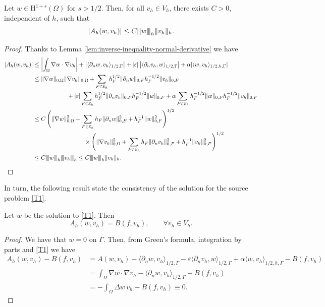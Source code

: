 \documentclass[onefignum,onetabnum,final]{siamart250211}
\numberwithin{equation}{section}
\newcommand\0{\boldsymbol{0}}
\renewcommand\O{\Omega}
\renewcommand\H{\mathrm{H}}
\newcommand\HusO{\H^{1+s}(\O)}
\def\CE{{\mathcal E}}
\newcommand{\vertiii}[1]{{\left\vert\kern-0.25ex\left\vert\kern-0.25ex\left\vert #1 
		\right\vert\kern-0.25ex\right\vert\kern-0.25ex\right\vert}}
\begin{document}
	\begin{lemma}\label{lem:continuity-in-triple-norm}
		Let $w\in\HusO$ for $s>1/2$. Then, for all $v_h\in V_h$, there exists $C>0$, independent of $h$, such that
		$$
		|A_h(w,v_h)|\leq C \vertiii{w}_h\Vert v_h\Vert_h.
		$$
	\end{lemma}
	\begin{proof}
		Thanks to Lemma \ref{lem:inverse-inequality-normal-derivative} we have
		$$
		\begin{aligned}
			|A_h(w,v_h)| &\leq \left\vert \int_{\O} \nabla w \cdot\nabla v_h \right\vert + \left\vert \langle \partial_n w,v_h\rangle_{1/2,\Gamma}\right\vert  + |\varepsilon| \left \vert \langle \partial_n v_h,w\rangle_{1/2,\Gamma} \right \vert  + \alpha|\langle w, v_h\rangle_{1/2,h,\Gamma}|\\
			&\leq \Vert \nabla w\Vert_{0,\O}\Vert \nabla v_h\Vert_{0,\O} + \sum_{F\in\CE_h} h_F^{1/2} \Vert \partial_n w\Vert_{0,F} h_F^{-1/2}\Vert v_h\Vert_{0,F}  \\
			&\hspace{2cm}+ |\varepsilon|\sum_{F\in\CE_h}h_F^{1/2} \Vert \partial_n v_h\Vert_{0,F} h_F^{-1/2}\Vert w\Vert_{0,F}+ \alpha\sum_{F\in\CE_h} h_F^{-1/2} \Vert  w\Vert_{0,F} h_F^{-1/2}\Vert v_h\Vert_{0,F}\\
			&\leq C \left(\Vert \nabla w\Vert_{0,\O}^2 + \sum_{F\in\CE_h} h_F\Vert \partial_n w\Vert_{0,F}^2+ h_F^{-1}\Vert w\Vert_{0,F}^2\right)^{1/2}\\
			&\hspace{3cm}\times \left(\Vert\nabla v_h\Vert_{0,\O}^2+\sum_{F\in\CE_h}h_F\Vert \partial_n v_h\Vert_{0,F}^2+ h_F^{-1}\Vert v_h\Vert_{0,F}^2\right)^{1/2}\\
			&\leq C \vertiii{w}_h\vertiii{v_h}_h\leq C\vertiii{w}_h\Vert v_h\Vert_h.
		\end{aligned}
		$$
	\end{proof}
	
	In turn, the following result state the consistency of the solution for the source problem \eqref{T1}.
	
	\begin{lemma}[Consistency]\label{lem:consistency}
		Let $w$ be the solution to \eqref{T1}. Then
		$$
		A_h(w,v_h)=B(f,v_h), \qquad \forall v_h\in V_h.
		$$
	\end{lemma}
	\begin{proof}
		We have that $w=0$ on $\Gamma$. Then, from Green's formula,
		integration by parts and \eqref{T1} we have
		$$
		\begin{aligned}
			A_h(w,v_h) - B(f,v_h)&= A(w,v_h) - \langle \partial_n w,v_h \rangle_{1/2,\Gamma} - \varepsilon\langle \partial_n v_h,w \rangle_{1/2,\Gamma} + \alpha\langle w,v_h \rangle_{1/2,h,\Gamma}- B(f,v_h)\\
			&=\int_{\O} \nabla w \cdot\nabla v_h - \langle \partial_n w,v_h \rangle_{1/2,\Gamma} -  B(f,v_h)\\
			&=-\int_{\O} \Delta w \, v_h - B (f,v_h) \equiv 0.
		\end{aligned}
		$$
	\end{proof}
	
\end{document}
